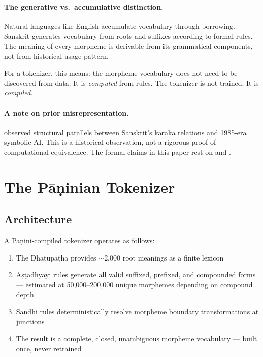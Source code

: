 \documentclass[11pt]{article}
\begin{document}
\paragraph{The generative vs.\ accumulative distinction.} Natural languages like English accumulate vocabulary through borrowing. Sanskrit generates vocabulary from roots and suffixes according to formal rules. The meaning of every morpheme is derivable from its grammatical components, not from historical usage pattern.

For a tokenizer, this means: the morpheme vocabulary does not need to be discovered from data. It is \textit{computed} from rules. The tokenizer is not trained. It is \textit{compiled}.

\paragraph{A note on prior misrepresentation.} \citet{briggs1985} observed structural parallels between Sanskrit's k\={a}raka relations and 1985-era symbolic AI. This is a historical observation, not a rigorous proof of computational equivalence. The formal claims in this paper rest on \citet{kiparsky2009} and \citet{huet2008}.

\section{The P\={a}\d{n}inian Tokenizer}

\subsection{Architecture}

A P\={a}\d{n}ini-compiled tokenizer operates as follows:

\begin{enumerate}
    \item The Dh\={a}tup\={a}\d{t}ha provides $\sim$2,000 root meanings as a finite lexicon
    \item A\d{s}\d{t}\={a}dhy\={a}y\={i} rules generate all valid suffixed, prefixed, and compounded forms --- estimated at 50,000--200,000 unique morphemes depending on compound depth
    \item Sandhi rules deterministically resolve morpheme boundary transformations at junctions
    \item The result is a complete, closed, unambiguous morpheme vocabulary --- built once, never retrained
\end{enumerate}
\end{document}
